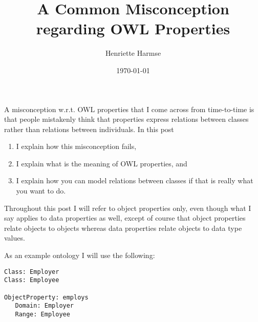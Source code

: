 \documentclass{amsart}
\title{A Common Misconception regarding OWL Properties}
\author{Henriette Harmse}
\date{\today}
\begin{document}
  \maketitle
  
  A misconception w.r.t. OWL properties that I come across from time-to-time is that people mistakenly think that properties express relations between classes rather than relations between individuals. In this post  
  \begin{enumerate}
   \item I explain how this misconception fails,
   \item I explain what is the meaning of OWL properties, and 
   \item I explain how you can model relations between classes if that is really what you want to do.
  \end{enumerate}
  
  Throughout this post I will refer to object properties only, even though what I say applies to data properties as well, except of course that object properties relate objects to objects whereas data properties relate objects to data type values.
 
  As an example ontology I will use the following:
\begin{small}
\begin{verbatim} 
Class: Employer
Class: Employee

ObjectProperty: employs
   Domain: Employer
   Range: Employee
\end{verbatim}
\end{small}    
  
  
\end{document}
